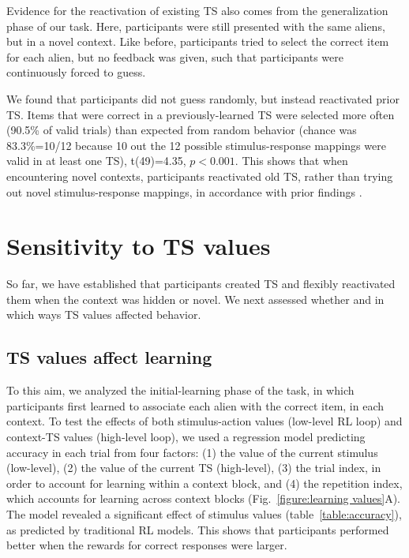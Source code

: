 \documentclass[10pt, letterpaper]{article}
\begin{document}
Evidence for the reactivation of existing TS also comes from the generalization phase of our task. Here, participants were still presented with the same aliens, but in a novel context. Like before, participants tried to select the correct item for each alien, but no feedback was given, such that participants were continuously forced to guess.

We found that participants did not guess randomly, but instead reactivated prior TS. Items that were correct in a previously-learned TS were selected more often (90.5\% of valid trials) than expected from random behavior (chance was 83.3\%=10/12 because 10 out the 12 possible stimulus-response mappings were valid in at least one TS), t(49)=4.35, $p<0.001$. This shows that when encountering novel contexts, participants reactivated old TS, rather than trying out novel stimulus-response mappings, in accordance with prior findings \cite{collins_cognitive_2013}.


\section{Sensitivity to TS values}

So far, we have established that participants created TS and flexibly reactivated them when the context was hidden or novel. We next assessed whether and in which ways TS values affected behavior.


\subsection{TS values affect learning}

To this aim, we analyzed the initial-learning phase of the task, in which participants first learned to associate each alien with the correct item, in each context. To test the effects of both stimulus-action values (low-level RL loop) and context-TS values (high-level loop), we used a regression model predicting accuracy in each trial from four factors: (1) the value of the current stimulus (low-level), (2) the value of the current TS (high-level), (3) the trial index, in order to account for learning within a context block, and (4) the repetition index, which accounts for learning across context blocks (Fig.~\ref{figure:learning values}A). The model revealed a significant effect of stimulus values (table~\ref{table:accuracy}), as predicted by traditional RL models. This shows that participants performed better when the rewards for correct responses were larger.
\end{document}
